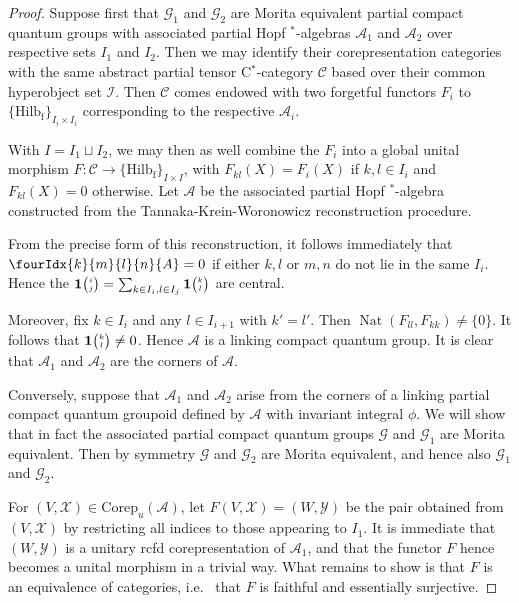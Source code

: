 \documentclass[10pt]{article}
\DeclareMathOperator{\fin}{\mathrm{f}}
\DeclareMathOperator{\Nat}{\mathrm{Nat}}
\newcommand{\Corep}{\mathrm{Corep}}
\newcommand{\CatCC}{\mathscr{C}}
\newcommand{\Hilb}{\mathrm{Hilb}}
\newcommand{\Grt}[3]{#1{\tiny{\begin{pmatrix} #2\\#3\end{pmatrix}}}}
\newcommand{\UnitC}[2]{\Grt{\mathbf{1}}{#1}{#2}}
\newcommand{\Gr}[5]{\fourIdx{#2}{#4}{#3}{#5}{#1}}%
\theoremstyle{definition}
\numberwithin{equation}{section}
\begin{document}
\begin{proof} Suppose first that $\mathscr{G}_1$ and $\mathscr{G}_2$ are Morita equivalent partial compact quantum groups with associated partial Hopf $^*$-algebras $\mathscr{A}_1$ and $\mathscr{A}_2$ over respective sets $I_1$ and $I_2$. Then we may identify their corepresentation categories with the same abstract partial tensor C$^*$-category $\CatCC$ based over their common hyperobject set $\mathscr{I}$. Then $\CatCC$ comes endowed with two forgetful functors $F_i$ to $\{\Hilb_{\fin}\}_{I_i\times I_i}$ corresponding to the respective $\mathscr{A}_i$.

With $I = I_1\sqcup I_2$, we may then as well combine the $F_i$ into a global unital morphism $F:\CatCC \rightarrow \{\Hilb_{\fin}\}_{I\times I}$, with $F_{kl}(X)=F_i(X)$ if $k,l\in I_i$ and $F_{kl}(X)=0$ otherwise. Let $\mathscr{A}$ be the associated partial Hopf $^*$-algebra constructed from the Tannaka-Krein-Woronowicz reconstruction procedure. 

From the precise form of this reconstruction, it follows immediately that $\Gr{A}{k}{l}{m}{n} =0$ if either $k,l$ or $m,n$ do not lie in the same $I_i$. Hence the $\UnitC{i}{j} = \sum_{k\in I_i,l\in I_j} \UnitC{k}{l}$ are central. 

Moreover, fix $k\in I_i$ and any $l\in I_{i+1}$ with $k'=l'$. Then $\Nat(F_{ll},F_{kk})\neq \{0\}$. It follows that $\UnitC{k}{l}\neq 0$. Hence $\mathscr{A}$ is a linking compact quantum group. It is clear that $\mathscr{A}_1$ and $\mathscr{A}_2$ are the corners of $\mathscr{A}$. 

Conversely, suppose that $\mathscr{A}_1$ and $\mathscr{A}_2$ arise from the corners of a linking partial compact quantum groupoid defined by $\mathscr{A}$ with invariant integral $\phi$. We will show that in fact the associated partial compact quantum groups $\mathscr{G}$ and $\mathscr{G}_1$ are Morita equivalent. Then by symmetry $\mathscr{G}$ and $\mathscr{G}_2$ are Morita equivalent, and hence also $\mathscr{G}_1$ and $\mathscr{G}_2$.


For $(V,\mathscr{X}) \in \Corep_u(\mathscr{A})$, let $F(V,\mathscr{X}) = (W,\mathscr{Y})$ be the pair obtained from $(V,\mathscr{X})$ by restricting all indices to those appearing to $I_1$. It is immediate that $(W,\mathscr{Y})$ is a unitary rcfd corepresentation of $\mathscr{A}_1$, and that the functor $F$ hence becomes a unital morphism in a trivial way. What remains to show is that $F$ is an equivalence of categories, i.e.~ that $F$ is faithful and essentially surjective. 


\end{proof}
\end{document}
